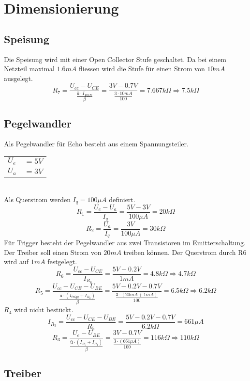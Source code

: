 



\section{Dimensionierung}

\subsection{Speisung}
Die Speisung wird mit einer Open Collector Stufe geschaltet. Da bei einem 
Netzteil maximal $1.6 mA$ fliessen wird die Stufe für einen Strom von 
$10 mA$ ausgelegt. 
\[ R_7 = \frac{U_{cc} - U_{CE}}{\frac{ü \cdot I_{PON}}{\beta}} 
= \frac{3 V - 0.7 V}{\frac{3 \cdot 10 mA}{100}} = 7.667 k\Omega 
\Rightarrow 7.5 k\Omega \]

\subsection{Pegelwandler}
Als Pegelwandler für Echo besteht aus einem Spannungsteiler. \\
\begin{tabular}{@{}ll}
  $U_e$ & $= 5 V$ \\
  $U_a$ & $= 3 V$ \\
\end{tabular} \\
Als Querstrom werden $I_q = 100 \mu A$ definiert. 
\[ R_1 = \frac{U_e - U_a}{I_q} = \frac{5 V - 3 V}{100 \mu A} = 20 k\Omega \]
\[ R_2 = \frac{U_a}{I_q} = \frac{3 V}{100 \mu A} = 30 k\Omega \]
Für Trigger besteht der Pegelwandler aus zwei Transistoren im 
Emitterschaltung. 
Der Treiber soll einen Strom von $20 mA$ treiben können. Der Querstrom 
durch R6 wird auf $1 mA$ festgelegt. 
\[ R_6 = \frac{U_{cc} - U_{CE}}{I_{R_6}} = \frac{5 V - 0.2 V}{1 mA} 
= 4.8 k\Omega \Rightarrow 4.7 k\Omega \]
\[ R_5 = \frac{U_{cc} - U_{CE} - U_{BE}}
{\frac{ü \cdot (I_{trigg} + I_ {R_6})}{\beta}}
= \frac{5 V - 0.2 V - 0.7 V}{\frac{3 \cdot (20 mA + 1 mA)}{100}} 
= 6.5 k\Omega \Rightarrow 6.2 k\Omega \]
$R_4$ wird nicht bestückt. 
\[ I_{R_5} = \frac{U_{cc} - U_{CE} - U_{BE}}{R_5} 
= \frac{5 V - 0.2 V - 0.7 V}{6.2 k\Omega} = 661 \mu A \]
\[ R_3 = \frac{U_e - U_{BE}}{\frac{ü \cdot (I_{R_5} + I_{R_4})}{\beta}} 
= \frac{3 V - 0.7 V}{\frac{3 \cdot (661 \mu A)}{100}} = 116 k\Omega 
\Rightarrow 110 k\Omega \]

\subsection{Treiber}
